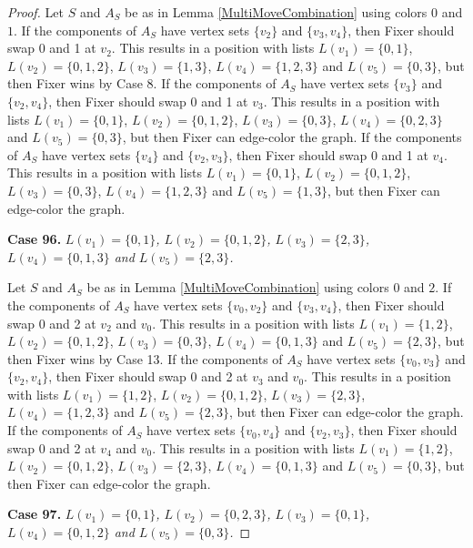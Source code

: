 \documentclass[12pt]{amsart}
\theoremstyle{plain}
\theoremstyle{definition}
\theoremstyle{remark}
\begin{document}
\begin{proof}
Let $S$ and $A_S$ be as in Lemma \ref{MultiMoveCombination} using colors $0$ and $1$. If the components of $A_S$ have vertex sets $\{v_2\}$ and $\{v_3, v_4\}$, then Fixer should swap 0 and 1 at $v_2$. This results in a position with lists $L(v_1) = \{0, 1\}$, $L(v_2) = \{0, 1, 2\}$, $L(v_3) = \{1, 3\}$, $L(v_4) = \{1, 2, 3\}$ and $L(v_5) = \{0, 3\}$, but then Fixer wins by Case 8.
If the components of $A_S$ have vertex sets $\{v_3\}$ and $\{v_2, v_4\}$, then Fixer should swap 0 and 1 at $v_3$. This results in a position with lists $L(v_1) = \{0, 1\}$, $L(v_2) = \{0, 1, 2\}$, $L(v_3) = \{0, 3\}$, $L(v_4) = \{0, 2, 3\}$ and $L(v_5) = \{0, 3\}$, but then Fixer can edge-color the graph.
If the components of $A_S$ have vertex sets $\{v_4\}$ and $\{v_2, v_3\}$, then Fixer should swap 0 and 1 at $v_4$. This results in a position with lists $L(v_1) = \{0, 1\}$, $L(v_2) = \{0, 1, 2\}$, $L(v_3) = \{0, 3\}$, $L(v_4) = \{1, 2, 3\}$ and $L(v_5) = \{1, 3\}$, but then Fixer can edge-color the graph.

\noindent\textbf{Case 96.  }\textit{$L(v_1) = \{0, 1\}$, $L(v_2) = \{0, 1, 2\}$, $L(v_3) = \{2, 3\}$, $L(v_4) = \{0, 1, 3\}$ and $L(v_5) = \{2, 3\}$.}

Let $S$ and $A_S$ be as in Lemma \ref{MultiMoveCombination} using colors $0$ and $2$. If the components of $A_S$ have vertex sets $\{v_0, v_2\}$ and $\{v_3, v_4\}$, then Fixer should swap 0 and 2 at $v_2$ and $v_0$. This results in a position with lists $L(v_1) = \{1, 2\}$, $L(v_2) = \{0, 1, 2\}$, $L(v_3) = \{0, 3\}$, $L(v_4) = \{0, 1, 3\}$ and $L(v_5) = \{2, 3\}$, but then Fixer wins by Case 13.
If the components of $A_S$ have vertex sets $\{v_0, v_3\}$ and $\{v_2, v_4\}$, then Fixer should swap 0 and 2 at $v_3$ and $v_0$. This results in a position with lists $L(v_1) = \{1, 2\}$, $L(v_2) = \{0, 1, 2\}$, $L(v_3) = \{2, 3\}$, $L(v_4) = \{1, 2, 3\}$ and $L(v_5) = \{2, 3\}$, but then Fixer can edge-color the graph.
If the components of $A_S$ have vertex sets $\{v_0, v_4\}$ and $\{v_2, v_3\}$, then Fixer should swap 0 and 2 at $v_4$ and $v_0$. This results in a position with lists $L(v_1) = \{1, 2\}$, $L(v_2) = \{0, 1, 2\}$, $L(v_3) = \{2, 3\}$, $L(v_4) = \{0, 1, 3\}$ and $L(v_5) = \{0, 3\}$, but then Fixer can edge-color the graph.

\noindent\textbf{Case 97.  }\textit{$L(v_1) = \{0, 1\}$, $L(v_2) = \{0, 2, 3\}$, $L(v_3) = \{0, 1\}$, $L(v_4) = \{0, 1, 2\}$ and $L(v_5) = \{0, 3\}$.}


\end{proof}
\end{document}
